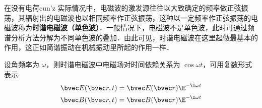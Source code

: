 在没有电荷cun'z
实际情况中，电磁波的激发源往往以大致确定的频率做正弦振荡，其辐射出的电磁波也以相同频率作正弦振荡，这种以一定频率作正弦振荡的电磁波称为\textbf{时谐电磁波（单色波）}．一般情况下，电磁波不是单色波，此时可通过频谱分析方法分解为不同单色波的叠加．由此可见，时谐电磁波在这里起做最基本的作用，这正如简谐振动在机械振动里所起的作用一样．

设角频率为 $\omega$，则时谐电磁波中电磁场对时间依赖关系为 $\cos\omega t$，可用复数形式表示
\begin{equation}
\begin{aligned}
\bvec E(\bvec r,t)=\bvec E(\bvec r)\E^{-\I\omega t}\\
\bvec B(\bvec r,t)=\bvec B(\bvec r)\E^{-\I\omega t}
\end{aligned}
\end{equation}
